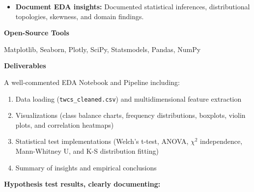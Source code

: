 \documentclass[12pt]{article}
\begin{document}
\begin{itemize}[leftmargin=1.5em]
    \item \textbf{Document EDA insights:} Documented statistical inferences, distributional topologies, skewness, and domain findings.
\end{itemize}

\vspace{0.8em}

\noindent \textbf{Open-Source Tools}

\noindent Matplotlib, Seaborn, Plotly, SciPy, Statsmodels, Pandas, NumPy

\vspace{0.8em}

\noindent \textbf{Deliverables}

\noindent A well-commented EDA Notebook and Pipeline including:
\begin{enumerate}[leftmargin=1.8em]
    \item Data loading (\texttt{twcs\_cleaned.csv}) and multidimensional feature extraction
    \item Visualizations (class balance charts, frequency distributions, boxplots, violin plots, and correlation heatmaps)
    \item Statistical test implementations (Welch's t-test, ANOVA, $\chi^2$ independence, Mann-Whitney U, and K-S distribution fitting)
    \item Summary of insights and empirical conclusions
\end{enumerate}

\newpage

\noindent \textbf{Hypothesis test results, clearly documenting:}

\vspace{0.5em}
\end{document}
